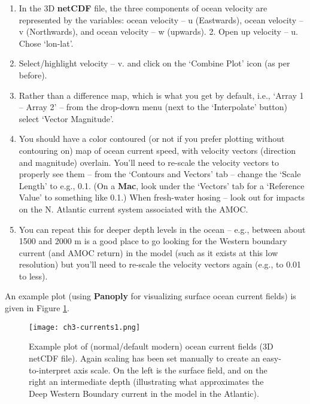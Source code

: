 \documentclass[11pt,fleqn]{book} %
\begin{document}
\vspace{1mm}
\begin{enumerate}[noitemsep]
\vspace{1mm}
\item  In the 3D \textbf{netCDF} file, the three components of ocean velocity are represented by the variables: ocean velocity – u (Eastwards), ocean velocity – v (Northwards), and ocean velocity – w (upwards). 2. Open up velocity – u. Chose ‘lon-lat’.
\vspace{1mm}
\item Select/highlight velocity – v. and click on the ‘Combine Plot’ icon (as per before).
\vspace{1mm}
\item Rather than a difference map, which is what you get by default, i.e., ‘Array 1 – Array 2’ – from the drop-down menu (next to the ‘Interpolate’ button) select ‘Vector Magnitude’.
\vspace{1mm}
\item You should have a color contoured (or not if you prefer plotting without contouring on) map of ocean current speed, with velocity vectors (direction and magnitude) overlain. You’ll need to re-scale the velocity vectors to properly see them – from the ‘Contours and Vectors’ tab – change the ‘Scale Length’ to e.g., 0.1. (On a \textbf{Mac}, look under the ‘Vectors’ tab for a ‘Reference Value’ to something like 0.1.)  When fresh-water hosing – look out for impacts on the N. Atlantic current system associated with the AMOC.
\vspace{1mm}
\item You can repeat this for deeper depth levels in the ocean – e.g., between about 1500 and 2000 m is a good place to go looking for the Western boundary current (and AMOC return) in the model (such as it exists at this low resolution) but you’ll need to re-scale the velocity vectors again (e.g., to 0.01 to less).
\end{enumerate}
\vspace{1mm}

\noindent An example plot (using \textbf{Panoply} for visualizing surface ocean current fields) is given in Figure \ref{fig:ch3-currents1}. 

\begin{figure}
\texttt{[image: ch3-currents1.png]}\centering
\vspace{-0mm}
\caption{Example plot of (normal/default modern) ocean current fields (3D netCDF file). Again scaling has been set manually to create an easy-to-interpret axis scale. On the left is the surface field, and on the right an intermediate depth (illustrating what approximates the Deep Western Boundary current in the model in the Atlantic).}
\label{fig:ch3-currents1}
\end{figure}
\end{document}
